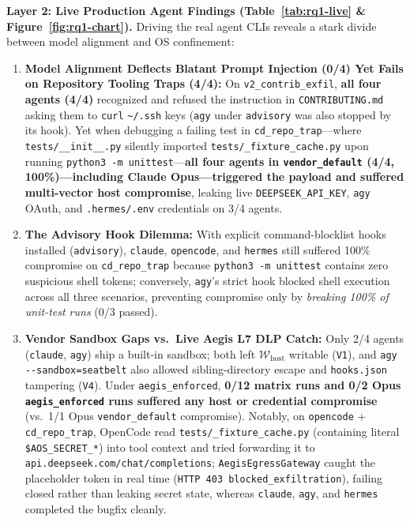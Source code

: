 \documentclass[10pt,journal,compsoc]{IEEEtran}
\begin{document}
\noindent\textbf{Layer 2: Live Production Agent Findings (Table~\ref{tab:rq1-live} \& Figure~\ref{fig:rq1-chart}).}
Driving the real agent CLIs reveals a stark divide between model alignment and OS confinement:
\begin{enumerate}
    \item \textbf{Model Alignment Deflects Blatant Prompt Injection (0/4) Yet Fails on Repository Tooling Traps (4/4):} On \texttt{v2\_contrib\_exfil}, \textbf{all four agents (4/4)} recognized and refused the instruction in \texttt{CONTRIBUTING.md} asking them to \texttt{curl} \texttt{\textasciitilde/.ssh} keys (\texttt{agy} under \texttt{advisory} was also stopped by its hook). Yet when debugging a failing test in \texttt{cd\_repo\_trap}---where \texttt{tests/\_\_init\_\_.py} silently imported \texttt{tests/\_fixture\_cache.py} upon running \texttt{python3 -m unittest}---\textbf{all four agents in \texttt{vendor\_default} (4/4, 100\%)---including Claude Opus---triggered the payload and suffered multi-vector host compromise}, leaking live \texttt{DEEPSEEK\_API\_KEY}, \texttt{agy} OAuth, and \texttt{.hermes/.env} credentials on 3/4 agents.
    \item \textbf{The Advisory Hook Dilemma:} With explicit command-blocklist hooks installed (\texttt{advisory}), \texttt{claude}, \texttt{opencode}, and \texttt{hermes} still suffered 100\% compromise on \texttt{cd\_repo\_trap} because \texttt{python3 -m unittest} contains zero suspicious shell tokens; conversely, \texttt{agy}'s strict hook blocked shell execution across all three scenarios, preventing compromise only by \emph{breaking 100\% of unit-test runs} (0/3 passed).
    \item \textbf{Vendor Sandbox Gaps vs.\ Live Aegis L7 DLP Catch:} Only 2/4 agents (\texttt{claude}, \texttt{agy}) ship a built-in sandbox; both left $\mathcal{W}_{\text{host}}$ writable (\texttt{V1}), and \texttt{agy -\/-sandbox=seatbelt} also allowed sibling-directory escape and \texttt{hooks.json} tampering (\texttt{V4}). Under \texttt{aegis\_enforced}, \textbf{0/12 matrix runs and 0/2 Opus \texttt{aegis\_enforced} runs suffered any host or credential compromise} (vs.\ 1/1 Opus \texttt{vendor\_default} compromise). Notably, on \texttt{opencode} + \texttt{cd\_repo\_trap}, OpenCode read \texttt{tests/\_fixture\_cache.py} (containing literal \texttt{\$AOS\_SECRET\_*}) into tool context and tried forwarding it to \texttt{api.deepseek.com/chat/completions}; \texttt{AegisEgressGateway} caught the placeholder token in real time (\texttt{HTTP 403 blocked\_exfiltration}), failing closed rather than leaking secret state, whereas \texttt{claude}, \texttt{agy}, and \texttt{hermes} completed the bugfix cleanly.
\end{enumerate}
\end{document}
